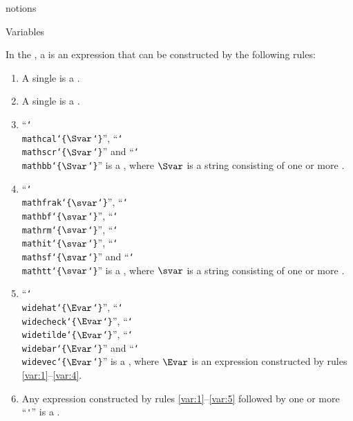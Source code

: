 \documentclass{stex}
\begin{document}
\begin{smodule}{notions}
\begin{sfragment}[id=sec:variables]{Variables}
\begin{sparagraph}[style=symdoc,for=variable]
    In the \texdialect, a  is an expression that can be constructed by the following rules:
    \begin{enumerate}
      \item\label{var:1} A single  is a .
      \item\label{var:2} A single  is a .
      \item\label{var:3} ``\texttt{\char`\\mathcal\char`\{$\Svar$\char`\}}'',
        ``\texttt{\char`\\mathscr\char`\{$\Svar$\char`\}}'' and
        ``\texttt{\char`\\mathbb\char`\{$\Svar$\char`\}}'' is a ,
        where $\Svar$ is a string consisting of one or more  .
      \item\label{var:4} ``\texttt{\char`\\mathfrak\char`\{$\svar$\char`\}}'',
        ``\texttt{\char`\\mathbf\char`\{$\svar$\char`\}}'',
        ``\texttt{\char`\\mathrm\char`\{$\svar$\char`\}}'',
        ``\texttt{\char`\\mathit\char`\{$\svar$\char`\}}'',
        ``\texttt{\char`\\mathsf\char`\{$\svar$\char`\}}'' and
        ``\texttt{\char`\\mathtt\char`\{$\svar$\char`\}}'' is a ,
        where $\svar$ is a string consisting of one or more .
      \item\label{var:5} ``\texttt{\char`\\widehat\char`\{$\Evar$\char`\}}'',
        ``\texttt{\char`\\widecheck\char`\{$\Evar$\char`\}}'',
        ``\texttt{\char`\\widetilde\char`\{$\Evar$\char`\}}'',
        ``\texttt{\char`\\widebar\char`\{$\Evar$\char`\}}'' and
        ``\texttt{\char`\\widevec\char`\{$\Evar$\char`\}}'' is a ,
        where $\Evar$ is an expression constructed by rules \ref{var:1}--\ref{var:4}.
      \item\label{var:6} Any expression constructed by rules \ref{var:1}--\ref{var:5} followed
        by one or more ``\texttt'''  is a .
    \end{enumerate}


\end{sparagraph}
\end{sfragment}
\end{smodule}
\end{document}
